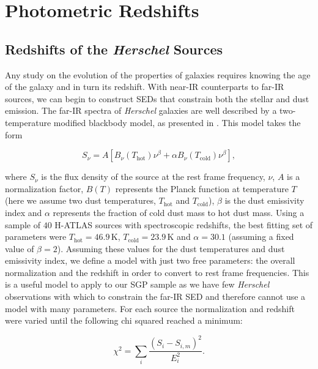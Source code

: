 \section{Photometric Redshifts}

\subsection{Redshifts of the \textit{Herschel} Sources}
\label{sec:phot_z_Herschel}

Any study on the evolution of the properties of galaxies requires knowing the age of the galaxy and in turn its redshift. With near-IR counterparts to far-IR sources, we can begin to construct SEDs that constrain both the stellar and dust emission. The far-IR spectra of \textit{Herschel} galaxies are well described by a two-temperature modified blackbody model, as presented in \citealt{Pearson_2013}. This model takes the form 

\begin{equation}
    S_\nu = A[B_\nu(T_{\textrm{hot}})\nu^\beta + \alpha B_\nu(T_{\textrm{cold}})\nu^\beta],
\label{eq:pearson_sed_model}
\end{equation}

\noindent where $S_\nu$ is the flux density of the source at the rest frame frequency, $\nu$, $A$ is a normalization factor, $B(T)$ represents the Planck function at temperature $T$ (here we assume two dust temperatures, $T_{\textrm{hot}}$ and $T_{\textrm{cold}}$), $\beta$ is the dust emissivity index and $\alpha$ represents the fraction of cold dust mass to hot dust mass. Using a sample of $40$ H-ATLAS sources with spectroscopic redshifts, the best fitting set of parameters were $T_{\textrm{hot}} = 46.9\,$K, $T_{\textrm{cold}} = 23.9\,$K and $\alpha = 30.1$ (assuming a fixed value of $\beta = 2$). Assuming these values for the dust temperatures and dust emissivity index, we define a model with just two free parameters: the overall normalization and the redshift in order to convert to rest frame frequencies. This is a useful model to apply to our SGP sample as we have few \textit{Herschel} observations with which to constrain the far-IR SED and therefore cannot use a model with many parameters. For each source the normalization and redshift were varied until the following chi squared reached a minimum:

\begin{equation}
    \chi^2 = \sum_i \frac{(S_i - S_{i,m})^2}{E_i^2}.
    \label{eq:chi_squared}
\end{equation}

